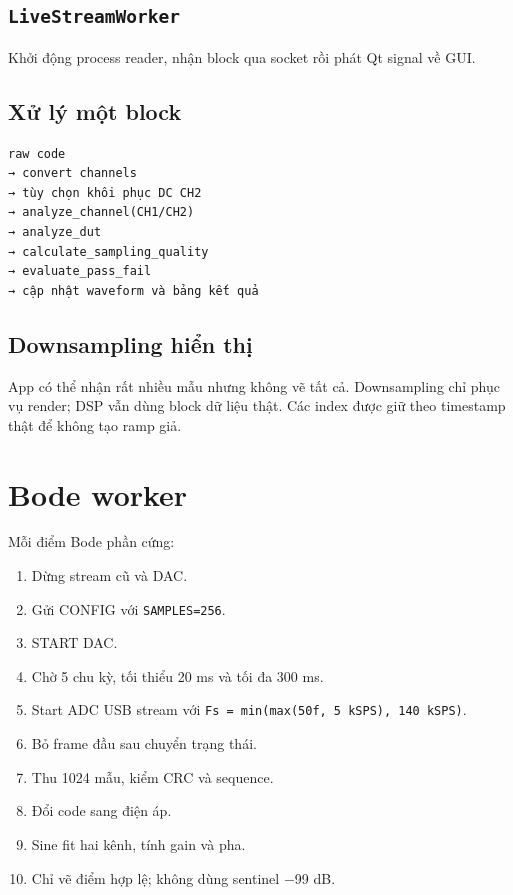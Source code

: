 \documentclass[12pt,a4paper,oneside]{article}
\newcommand{\inlinecode}[1]{\texttt{#1}}
\begin{document}
\subsection{\inlinecode{LiveStreamWorker}}

Khởi động process reader, nhận block qua socket rồi phát Qt signal về GUI.

\subsection{Xử lý một block}

\begin{Verbatim}[breaklines=true,breakanywhere=true,fontsize=\small]
raw code
→ convert channels
→ tùy chọn khôi phục DC CH2
→ analyze_channel(CH1/CH2)
→ analyze_dut
→ calculate_sampling_quality
→ evaluate_pass_fail
→ cập nhật waveform và bảng kết quả
\end{Verbatim}

\subsection{Downsampling hiển thị}

App có thể nhận rất nhiều mẫu nhưng không vẽ tất cả. Downsampling chỉ phục vụ render; DSP vẫn dùng block dữ liệu thật. Các index được giữ theo timestamp thật để không tạo ramp giả.

\section{Bode worker}

Mỗi điểm Bode phần cứng:

\begin{enumerate}
\item Dừng stream cũ và DAC.
\item Gửi CONFIG với \inlinecode{SAMPLES=256}.
\item START DAC.
\item Chờ 5 chu kỳ, tối thiểu 20 ms và tối đa 300 ms.
\item Start ADC USB stream với \inlinecode{Fs = min(max(50f, 5 kSPS), 140 kSPS)}.
\item Bỏ frame đầu sau chuyển trạng thái.
\item Thu 1024 mẫu, kiểm CRC và sequence.
\item Đổi code sang điện áp.
\item Sine fit hai kênh, tính gain và pha.
\item Chỉ vẽ điểm hợp lệ; không dùng sentinel −99 dB.
\end{enumerate}
\end{document}

